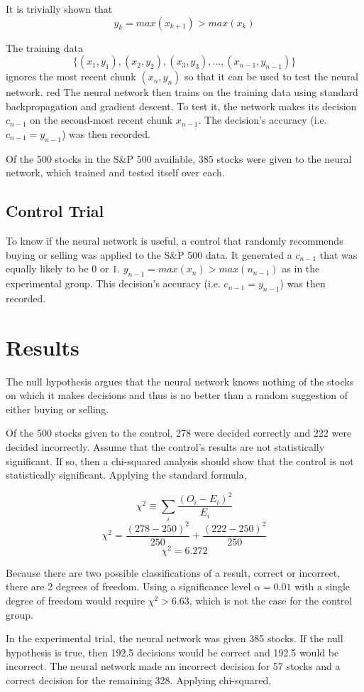 \documentclass[twocolumn]{article}
\begin{document}
It is trivially shown that
$$y_k = max(x_{k+1}) > max(x_k)$$

The training data
$$\{(x_1, y_1), (x_2, y_2), (x_3, y_3), ..., (x_{n-1}, y_{n-1})\}$$
ignores the most recent chunk $(x_n, y_n)$ so that it can be used to test the neural network.
red
The neural network then trains on the training data using standard backpropagation and gradient descent. To test it, the network makes its decision $c_{n-1}$ on the second-most recent chunk $x_{n-1}$. The decision's accuracy (i.e. $c_{n-1} = y_{n-1}$) was then recorded.

Of the 500 stocks in the S\&P 500 available, 385 stocks were given to the neural network, which trained and tested itself over each.

\subsection{Control Trial}
To know if the neural network is useful, a control that randomly recommends buying or selling was applied to the S\&P 500 data. It generated a $c_{n-1}$ that was equally likely to be $0$ or $1$. $y_{n-1} = max(x_n) > max(n_{n-1})$ as in the experimental group. This decision's accuracy (i.e. $c_{n-1} = y_{n-1}$) was then recorded.

\section{Results}
The null hypothesis argues that the neural network knows nothing of the stocks on which it makes decisions and thus is no better than a random suggestion of either buying or selling.

Of the 500 stocks given to the control, 278 were decided correctly and 222 were decided incorrectly. Assume that the control's results are not statistically significant. If so, then a chi-squared analysis should show that the control is not statistically significant. Applying the standard formula,

$$\chi^2 \equiv \sum_{i} \frac{(O_i - E_i)^2}{E_i}$$
$$\chi^2 = \frac{(278 - 250)^2}{250} + \frac{(222 - 250)^2}{250}$$
$$\chi^2 = 6.272$$

Because there are two possible classifications of a result, correct or incorrect, there are 2 degrees of freedom. Using a significance level $\alpha = 0.01$ with a single degree of freedom would require $\chi^2 > 6.63$, which is not the case for the control group.

In the experimental trial, the neural network was given 385 stocks. If the null hypothesis is true, then 192.5 decisions would be correct and 192.5 would be incorrect. The neural network made an incorrect decision for 57 stocks and a correct decision for the remaining 328. Applying chi-squared,
\end{document}
